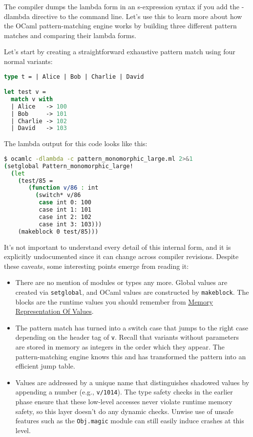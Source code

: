 The compiler dumps the lambda form in an s-expression syntax if you add
the {-dlambda} directive to the command line. Let's use this to learn
more about how the OCaml pattern-matching engine works by building three
different pattern matches and comparing their lambda
forms.

Let's start by creating a straightforward exhaustive pattern match using
four normal variants:

\begin{lstlisting}[language=Caml]
type t = | Alice | Bob | Charlie | David

let test v =
  match v with
  | Alice   -> 100
  | Bob     -> 101
  | Charlie -> 102
  | David   -> 103
\end{lstlisting}

The lambda output for this code looks like this:

\begin{lstlisting}[language=bash]
$ ocamlc -dlambda -c pattern_monomorphic_large.ml 2>&1
(setglobal Pattern_monomorphic_large!
  (let
    (test/85 =
       (function v/86 : int
         (switch* v/86
          case int 0: 100
          case int 1: 101
          case int 2: 102
          case int 3: 103)))
    (makeblock 0 test/85)))
\end{lstlisting}

It's not important to understand every detail of this internal form, and
it is explicitly undocumented since it can change across compiler
revisions. Despite these caveats, some interesting points emerge from
reading it:

\begin{itemize}
\item
  There are no mention of modules or types any more. Global values are
  created via \passthrough{\lstinline!setglobal!}, and OCaml values are
  constructed by \passthrough{\lstinline!makeblock!}. The blocks are the
  runtime values you should remember from
  \href{runtime-memory-layout.html\#memory-representation-of-values}{Memory
  Representation Of Values}.
\item
  The pattern match has turned into a switch case that jumps to the
  right case depending on the header tag of \passthrough{\lstinline!v!}.
  Recall that variants without parameters are stored in memory as
  integers in the order which they appear. The pattern-matching engine
  knows this and has transformed the pattern into an efficient jump
  table.
\item
  Values are addressed by a unique name that distinguishes shadowed
  values by appending a number (e.g., \passthrough{\lstinline!v/1014!}).
  The type safety checks in the earlier phase ensure that these
  low-level accesses never violate runtime memory safety, so this layer
  doesn't do any dynamic checks. Unwise use of unsafe features such as
  the \passthrough{\lstinline!Obj.magic!} module can still easily induce
  crashes at this level.
\end{itemize}

